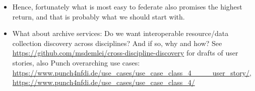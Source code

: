\begin{itemize}
\item Hence, fortunately what is most easy to federate also promises the
highest return, and that is probably what we should start with.

\item What about archive services: Do we want interoperable resource/data
collection discovery across disciplines?  And if so, why and how?  See
\url{https://github.com/msdemlei/cross-discipline-discovery} for drafts of
user stories, also Punch overarching use cases:
\url{https://www.punch4nfdi.de/use_cases/use_case_class_4____user_story/},
\url{https://www.punch4nfdi.de/use_cases/use_case_class_4/}
\end{itemize}
